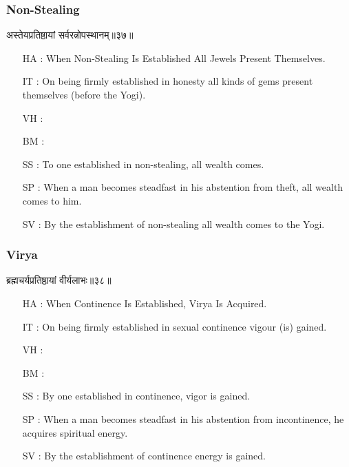 \begin{frame}[fragile]\frametitle{Non-Stealing}
\begin{sanskrit}
अस्तेयप्रतिष्ठायां सर्वरत्नोपस्थानम्॥३७॥
\end{sanskrit}

	\begin{itemize}
	\item [HA]: When Non-Stealing Is Established All Jewels Present Themselves.
	\item [IT]: On being firmly established in honesty all kinds of gems present themselves (before the Yogi).
	\item [VH]: 
	\item [BM]: 
	\item [SS]: To one established in non-stealing, all wealth comes.
	\item [SP]: When a man becomes steadfast in his abstention from theft, all wealth comes to him.
	\item [SV]: By the establishment of non-stealing all wealth comes to the Yogi. 
	\end{itemize}
\end{frame}


\begin{frame}[fragile]\frametitle{Virya}
\begin{sanskrit}
ब्रह्मचर्यप्रतिष्ठायां वीर्यलाभः॥३८॥
\end{sanskrit}

	\begin{itemize}
	\item [HA]: When Continence Is Established, Virya Is Acquired.
	\item [IT]: On being firmly established in sexual continence vigour (is) gained.
	\item [VH]: 
	\item [BM]: 
	\item [SS]: By one established in continence, vigor is gained.
	\item [SP]: When a man becomes steadfast in his abstention from incontinence, he acquires spiritual energy.
	\item [SV]: By the establishment of continence energy is gained. 
	\end{itemize}
\end{frame}


